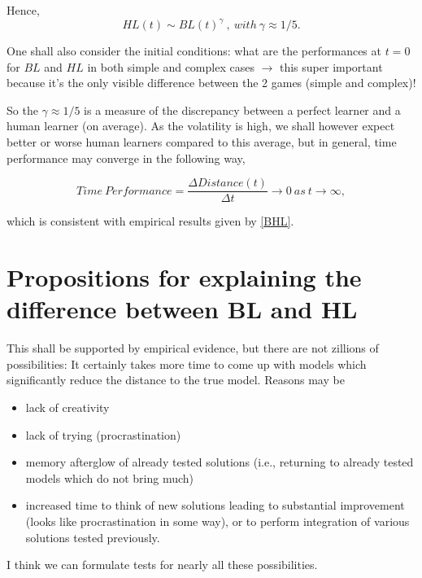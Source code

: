 \documentclass{article}
\begin{document}
Hence, 
\begin{equation}
HL(t) \sim BL(t)^{\gamma}~,~with~\gamma \approx 1/5.
\end{equation}

One shall also consider the initial conditions: what are the performances at $t=0$ for $BL$ and $HL$ in both simple and complex cases $\rightarrow$ this super important because it's the only visible difference between the 2 games (simple and complex)!

So the $\gamma \approx 1/5$ is a measure of the discrepancy between a perfect learner and a human learner (on average). As the volatility is high, we shall however expect better or worse human learners compared to this average, but in general, time performance may converge in the following way,

\begin{equation}
Time~Performance = \frac{\Delta Distance(t)}{\Delta t} \rightarrow 0~as~t\rightarrow \infty,
\end{equation}

which is consistent with empirical results given by \ref{BHL}.


  
  
  
  
  

\section{Propositions for explaining the difference between BL and HL}

This shall be supported by empirical evidence, but there are not zillions of possibilities: It certainly takes more time to come up with models which significantly reduce the distance to the true model. Reasons may be 

\begin{itemize}
\item lack of creativity
\item lack of trying (procrastination)
\item memory afterglow of already tested solutions (i.e., returning to already tested models which do not bring much)
\item increased time to think of new solutions leading to substantial improvement (looks like procrastination in some way), or to perform integration of various solutions tested previously.
\end{itemize}

I think we can formulate tests for nearly all these possibilities.
\end{document}
